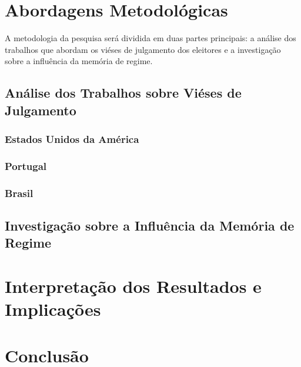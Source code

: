 \section{Abordagens Metodológicas}
A metodologia da pesquisa será dividida em duas partes principais: a análise dos trabalhos que abordam os viéses de julgamento dos eleitores e a investigação sobre a influência da memória de regime.

\subsection{Análise dos Trabalhos sobre Viéses de Julgamento}

\subsubsection{Estados Unidos da América}

\subsubsection{Portugal}

\subsubsection{Brasil}

\subsection{Investigação sobre a Influência da Memória de Regime}


\section{Interpretação dos Resultados e Implicações}

\section{Conclusão}

